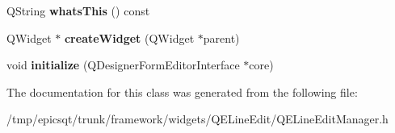 \begin{DoxyCompactItemize}
\item 
\hypertarget{classQELineEditManager_abf821af39bea6aa2094561be77be861c}{
QString {\bfseries whatsThis} () const }
\label{classQELineEditManager_abf821af39bea6aa2094561be77be861c}

\item 
\hypertarget{classQELineEditManager_a61482a284295e324b297f3eb8ec0d91e}{
QWidget $\ast$ {\bfseries createWidget} (QWidget $\ast$parent)}
\label{classQELineEditManager_a61482a284295e324b297f3eb8ec0d91e}

\item 
\hypertarget{classQELineEditManager_aad044300565527252c5fbe3a8eb73bf4}{
void {\bfseries initialize} (QDesignerFormEditorInterface $\ast$core)}
\label{classQELineEditManager_aad044300565527252c5fbe3a8eb73bf4}

\end{DoxyCompactItemize}


The documentation for this class was generated from the following file:\begin{DoxyCompactItemize}
\item 
/tmp/epicsqt/trunk/framework/widgets/QELineEdit/QELineEditManager.h\end{DoxyCompactItemize}
